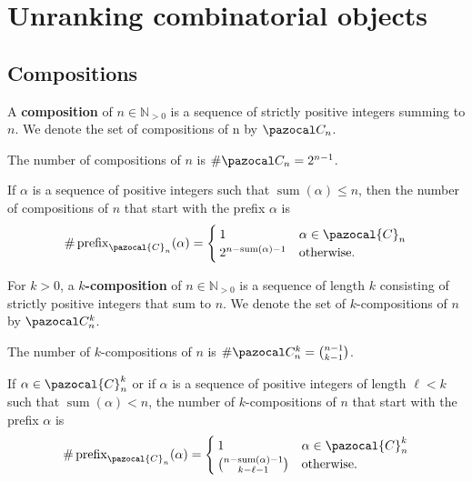 \section{Unranking combinatorial objects}
\label{apndx:unranking}
\subsection{Compositions}
\begin{definition}
  A \textbf{composition} of $n \in \mathbb{N}_{>0}$ is a sequence of
  strictly positive integers summing to $n$. We denote the set of compositions
  of n by $\pazocal C_n$.
\end{definition}

\begin{lemma} %
  The number of compositions of $n$ is $\#\pazocal C_n = 2^{n-1}$.
\end{lemma}

\begin{proposition}
  If $\alpha$ is a sequence of positive integers such that
  $\operatorname{sum}(\alpha) \leq n$, then
  the number of compositions of $n$ that start with the prefix $\alpha$
  is \begin{equation}
    \#\operatorname{prefix}_{\pazocal{C}_n}(\alpha) = \begin{cases}
      1 & \alpha \in \pazocal{C}_n \\
      2^{n - \operatorname{sum}(\alpha) - 1} & \text{otherwise}.
    \end{cases}
  \end{equation}
\end{proposition}

\begin{definition}
  For $k > 0$, a $k$\textbf{-composition} of $n \in \mathbb{N}_{>0}$
  is a sequence of length $k$ consisting of strictly positive integers that sum
  to $n$. We denote the set of $k$-compositions of $n$ by $\pazocal C_n^{k}$.
\end{definition}

\begin{lemma}
  The number of $k$-compositions of $n$ is $\#\pazocal C_n^{k} = \binom{n-1}{k-1}$.
\end{lemma}

\begin{proposition}
  If $\alpha \in \pazocal{C}_n^{k}$ or if $\alpha$ is
  a sequence of positive integers of length $\ell < k$ such that
  ${\operatorname{sum}(\alpha) < n}$,
  the number of $k$-compositions of $n$ that start with the prefix $\alpha$
  is \begin{equation}
    \#\operatorname{prefix}_{\pazocal{C}_n}(\alpha) = \begin{cases}
      1 & \alpha \in \pazocal{C}_n^{k} \\
      \binom{n - \operatorname{sum}(\alpha) - 1}{k - \ell - 1} & \text{otherwise}.
    \end{cases}
  \end{equation}
\end{proposition}

